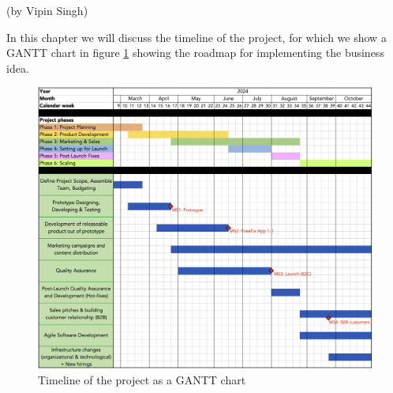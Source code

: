 (by Vipin Singh)

\p
In this chapter we will discuss the timeline of the project, for which we show a GANTT chart in figure \ref{fig:timeline_gantt} showing the roadmap for implementing the business idea.

\begin{figure}[H]
    \centering
    \includegraphics[width=\textwidth]{figures/GANTT_timeline.png}
    \caption{Timeline of the project as a GANTT chart}
    \label{fig:timeline_gantt}
\end{figure}

